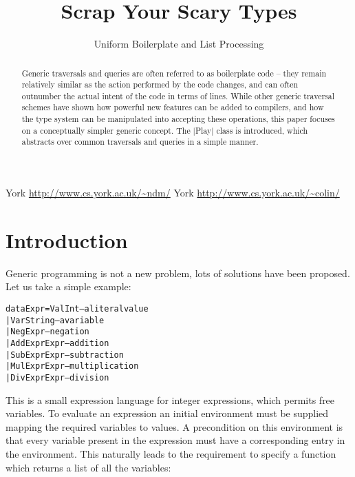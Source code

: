\documentclass[preprint]{sigplanconf}
\newenvironment{code}{\begin{alltt}\small}{\end{alltt}}
\begin{document}
\copyrightdata{[to be supplied]}

\titlebanner{\today{} - \currenttime{}}        %
\preprintfooter{}   %

\title{Scrap Your Scary Types}
\subtitle{Uniform Boilerplate and List Processing}

           {York}
           {\url{http://www.cs.york.ac.uk/~ndm/}}
           {York}
           {\url{http://www.cs.york.ac.uk/~colin/}}

\maketitle

\begin{abstract}
Generic traversals and queries are often referred to as boilerplate code -- they remain relatively similar as the action performed by the code changes, and can often outnumber the actual intent of the code in terms of lines. While other generic traversal schemes have shown how powerful new features can be added to compilers, and how the type system can be manipulated into accepting these operations, this paper focuses on a conceptually simpler generic concept. The |Play| class is introduced, which abstracts over common traversals and queries in a simple manner.
\end{abstract}

\section{Introduction}

Generic programming is not a new problem, lots of solutions have been proposed. Let us take a simple example:

\begin{code}
data Expr  =  Val  Int         -- a literal value
           |  Var  String      -- a variable
           |  Neg  Expr        -- negation
           |  Add  Expr  Expr  -- addition
           |  Sub  Expr  Expr  -- subtraction
           |  Mul  Expr  Expr  -- multiplication
           |  Div  Expr  Expr  -- division
\end{code}

This is a small expression language for integer expressions, which permits free variables. To evaluate an expression an initial environment must be supplied mapping the required variables to values. A precondition on this environment is that every variable present in the expression must have a corresponding entry in the environment. This naturally leads to the requirement to specify a function which returns a list of all the variables:
\end{document}

